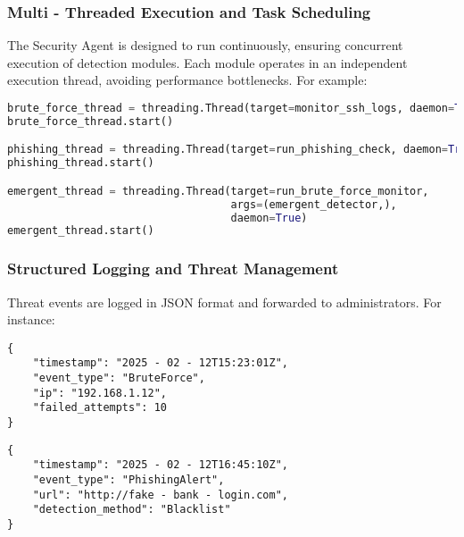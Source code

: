 \documentclass{article}
\begin{document}
\subsubsection{Multi - Threaded Execution and Task Scheduling}
The Security Agent is designed to run continuously, ensuring concurrent execution of detection modules. Each module operates in an independent execution thread, avoiding performance bottlenecks. For example:
\begin{lstlisting}[language=Python, breaklines=true, frame=single, backgroundcolor=\color{gray!10}]
brute_force_thread = threading.Thread(target=monitor_ssh_logs, daemon=True)
brute_force_thread.start()

phishing_thread = threading.Thread(target=run_phishing_check, daemon=True)
phishing_thread.start()

emergent_thread = threading.Thread(target=run_brute_force_monitor, 
                                   args=(emergent_detector,), 
                                   daemon=True)
emergent_thread.start()
\end{lstlisting}

\subsubsection{Structured Logging and Threat Management}
Threat events are logged in JSON format and forwarded to administrators. For instance:
\begin{lstlisting}
{
    "timestamp": "2025 - 02 - 12T15:23:01Z",
    "event_type": "BruteForce",
    "ip": "192.168.1.12",
    "failed_attempts": 10
}
\end{lstlisting}

\begin{lstlisting}
{
    "timestamp": "2025 - 02 - 12T16:45:10Z",
    "event_type": "PhishingAlert",
    "url": "http://fake - bank - login.com",
    "detection_method": "Blacklist"
}
\end{lstlisting}
\end{document}
